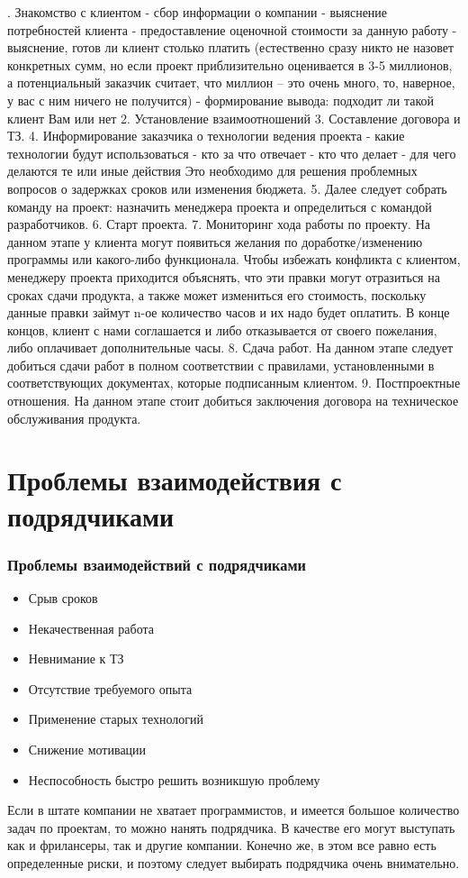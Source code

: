 \documentclass{../industrial-development}
\begin{document}
. Знакомство с клиентом
  - сбор информации о компании
  -  выяснение потребностей клиента
  - предоставление оценочной стоимости за данную работу
 -  выяснение, готов ли клиент столько платить (естественно сразу никто не назовет конкретных сумм, но если проект приблизительно оценивается в 3-5 миллионов, а потенциальный заказчик считает, что миллион –  это очень много, то, наверное, у вас с ним ничего не получится)
  - формирование вывода: подходит ли такой клиент Вам или нет
2. Установление взаимоотношений
3. Составление договора и ТЗ.
4. Информирование заказчика о технологии ведения проекта
 - какие технологии будут использоваться
 - кто за что отвечает
 - кто что делает
 - для чего делаются те или иные действия
 Это необходимо для решения проблемных вопросов о задержках сроков или изменения бюджета.
5. Далее следует собрать команду на проект: назначить менеджера проекта и определиться с командой разработчиков.
6. Старт проекта.
7. Мониторинг хода работы по проекту. 
На данном этапе у клиента могут появиться желания по доработке/изменению программы или какого-либо функционала. Чтобы избежать конфликта с клиентом, менеджеру проекта приходится объяснять, что эти правки могут отразиться на сроках сдачи продукта, а также может измениться его стоимость, поскольку данные правки займут n-ое количество часов и их надо будет оплатить. В конце концов, клиент с нами соглашается и либо отказывается от своего пожелания, либо оплачивает дополнительные часы. 
8. Сдача работ.
На данном этапе следует добиться сдачи работ в полном соответствии с правилами, установленными в соответствующих документах, которые подписанным клиентом.
9. Постпроектные отношения. 
На данном этапе стоит добиться заключения договора на техническое обслуживания продукта.

\section{Проблемы взаимодействия с подрядчиками}
\begin{frame} \frametitle{Проблемы взаимодействий с подрядчиками}

\begin{itemize}
 \item Срыв сроков 
 \item Некачественная работа
 \item Невнимание к ТЗ
 \item Отсутствие требуемого опыта
 \item Применение старых технологий
 \item Снижение мотивации
 \item Неспособность быстро решить возникшую проблему
  \end{itemize}
\end{frame}

\lecturenotes
Если в штате компании не хватает программистов, и имеется большое количество задач по проектам, то можно нанять подрядчика. В качестве его могут выступать как и фрилансеры, так и другие компании. Конечно же, в этом все равно есть определенные риски, и поэтому следует выбирать подрядчика очень внимательно. 

\begin{thebibliography}{99}
\end{thebibliography}
\end{document}

